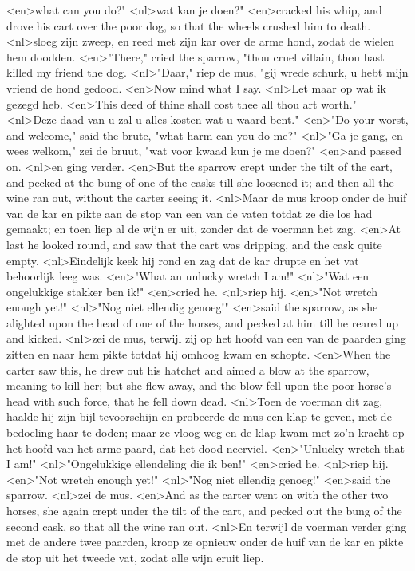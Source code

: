 <en>what can you do?"
<nl>wat kan je doen?"
<en>cracked his whip, and drove his cart over the poor dog, so that the wheels crushed him to death.
<nl>sloeg zijn zweep, en reed met zijn kar over de arme hond, zodat de wielen hem doodden.
<en>"There," cried the sparrow, "thou cruel villain, thou hast killed my friend the dog.
<nl>"Daar," riep de mus, "gij wrede schurk, u hebt mijn vriend de hond gedood.
<en>Now mind what I say.
<nl>Let maar op wat ik gezegd heb.
<en>This deed of thine shall cost thee all thou art worth."
<nl>Deze daad van u zal u alles kosten wat u waard bent."
<en>"Do your worst, and welcome," said the brute, "what harm can you do me?"
<nl>"Ga je gang, en wees welkom," zei de bruut, "wat voor kwaad kun je me doen?"
<en>and passed on.
<nl>en ging verder.
<en>But the sparrow crept under the tilt of the cart, and pecked at the bung of one of the casks till she loosened it; and then all the wine ran out, without the carter seeing it.
<nl>Maar de mus kroop onder de huif van de kar en pikte aan de stop van een van de vaten totdat ze die los had gemaakt; en toen liep al de wijn er uit, zonder dat de voerman het zag.
<en>At last he looked round, and saw that the cart was dripping, and the cask quite empty.
<nl>Eindelijk keek hij rond en zag dat de kar drupte en het vat behoorlijk leeg was.
<en>"What an unlucky wretch I am!"
<nl>"Wat een ongelukkige stakker ben ik!"
<en>cried he.
<nl>riep hij.
<en>"Not wretch enough yet!"
<nl>"Nog niet ellendig genoeg!"
<en>said the sparrow, as she alighted upon the head of one of the horses, and pecked at him till he reared up and kicked.
<nl>zei de mus, terwijl zij op het hoofd van een van de paarden ging zitten en naar hem pikte totdat hij omhoog kwam en schopte.
<en>When the carter saw this, he drew out his hatchet and aimed a blow at the sparrow, meaning to kill her; but she flew away, and the blow fell upon the poor horse’s head with such force, that he fell down dead.
<nl>Toen de voerman dit zag, haalde hij zijn bijl tevoorschijn en probeerde  de  mus een klap te geven, met de bedoeling  haar te  doden; maar ze vloog weg en de klap kwam met zo'n kracht op het hoofd van het arme paard, dat het dood neerviel.
<en>"Unlucky wretch that I am!"
<nl>"Ongelukkige ellendeling die ik ben!"
<en>cried he.
<nl>riep hij.
<en>"Not wretch enough yet!"
<nl>"Nog niet ellendig genoeg!"
<en>said the sparrow.
<nl>zei de mus.
<en>And as the carter went on with the other two horses, she again crept under the tilt of the cart, and pecked out the bung of the second cask, so that all the wine ran out.
<nl>En terwijl de voerman verder ging met de andere twee paarden, kroop ze opnieuw onder de huif van de kar en pikte de stop uit het tweede vat, zodat alle wijn eruit liep.
